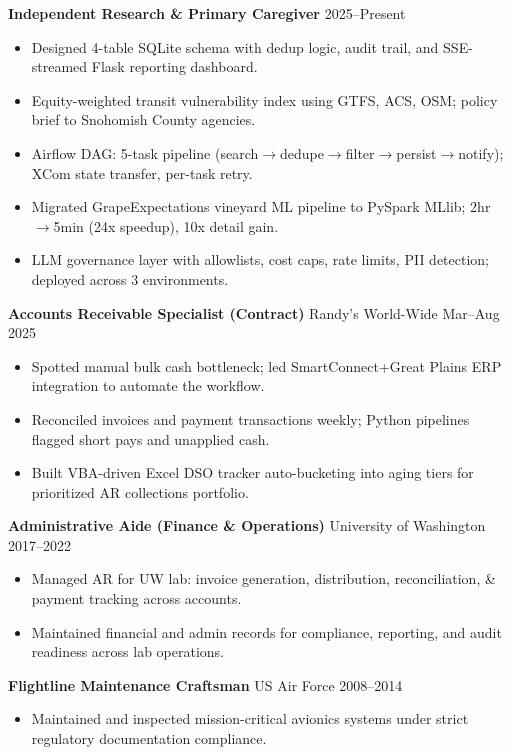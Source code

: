 \documentclass[11pt,a4paper]{article}
\begin{document}
\noindent
\textbf{Independent Research \& Primary Caregiver} \hfill 2025--Present
\begin{itemize}
    \item Designed 4-table SQLite schema with dedup logic, audit trail, and SSE-streamed Flask reporting dashboard.
    \item Equity-weighted transit vulnerability index using GTFS, ACS, OSM; policy brief to Snohomish County agencies.
    \item Airflow DAG: 5-task pipeline (search$\rightarrow$dedupe$\rightarrow$filter$\rightarrow$persist$\rightarrow$notify); XCom state transfer, per-task retry.
    \item Migrated GrapeExpectations vineyard ML pipeline to PySpark MLlib; 2hr$\rightarrow$5min (24x speedup), 10x detail gain.
    \item LLM governance layer with allowlists, cost caps, rate limits, PII detection; deployed across 3 environments.
\end{itemize}

\vspace{0.2cm}
\noindent
\textbf{Accounts Receivable Specialist (Contract)} \hfill Randy's World-Wide \hfill Mar--Aug 2025
\begin{itemize}
    \item Spotted manual bulk cash bottleneck; led SmartConnect+Great Plains ERP integration to automate the workflow.
    \item Reconciled invoices and payment transactions weekly; Python pipelines flagged short pays and unapplied cash.
    \item Built VBA-driven Excel DSO tracker auto-bucketing into aging tiers for prioritized AR collections portfolio.
\end{itemize}

\vspace{0.2cm}
\noindent
\textbf{Administrative Aide (Finance \& Operations)} \hfill University of Washington \hfill 2017--2022
\begin{itemize}
    \item Managed AR for UW lab: invoice generation, distribution, reconciliation, \& payment tracking across accounts.
    \item Maintained financial and admin records for compliance, reporting, and audit readiness across lab operations.
\end{itemize}

\vspace{0.2cm}
\noindent
\textbf{Flightline Maintenance Craftsman} \hfill US Air Force \hfill 2008--2014
\begin{itemize}
    \item Maintained and inspected mission-critical avionics systems under strict regulatory documentation compliance.
\end{itemize}
\end{document}
